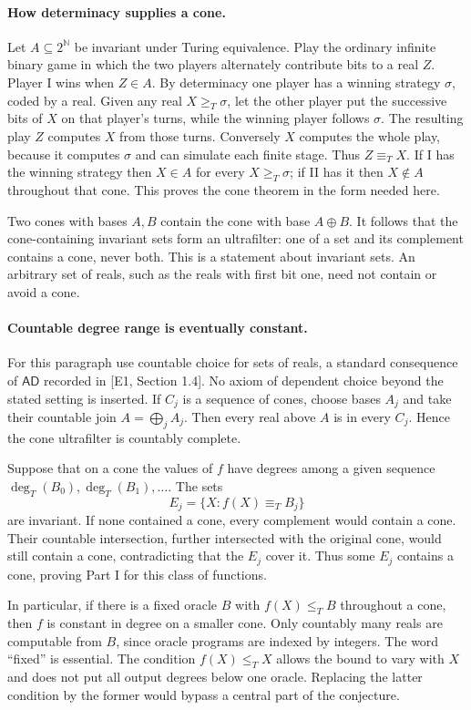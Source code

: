 \documentclass[11pt]{article}
\begin{document}
\paragraph{How determinacy supplies a cone.}
Let $A\subseteq2^{\mathbb N}$ be invariant under Turing equivalence.
Play the ordinary infinite binary game in which the two players
alternately contribute bits to a real $Z$. Player I wins when $Z\in A$.
By determinacy one player has a winning strategy $\sigma$, coded by
a real. Given any real $X\ge_T\sigma$, let the other player put the
successive bits of $X$ on that player's turns, while the winning player
follows $\sigma$. The resulting play $Z$ computes $X$ from those
turns. Conversely $X$ computes the whole play, because it computes
$\sigma$ and can simulate each finite stage. Thus $Z\equiv_T X$.
If I has the winning strategy then $X\in A$ for every $X\ge_T\sigma$;
if II has it then $X\notin A$ throughout that cone. This proves the
cone theorem in the form needed here.

Two cones with bases $A,B$ contain the cone with base $A\oplus B$.
It follows that the cone-containing invariant sets form an ultrafilter:
one of a set and its complement contains a cone, never both. This is
a statement about invariant sets. An arbitrary set of reals, such as
the reals with first bit one, need not contain or avoid a cone.

\paragraph{Countable degree range is eventually constant.}
For this paragraph use countable choice for sets of reals, a standard
consequence of $\mathsf{AD}$ recorded in [E1, Section 1.4]. No axiom
of dependent choice beyond the stated setting is inserted. If
$C_j$ is a sequence of cones, choose bases $A_j$ and take their
countable join $A=\bigoplus_j A_j$. Then every real above $A$ is in
every $C_j$. Hence the cone ultrafilter is countably complete.

Suppose that on a cone the values of $f$ have degrees among a given
sequence $\deg_T(B_0),\deg_T(B_1),\ldots$. The sets
\[
 E_j=\{X:f(X)\equiv_T B_j\}
\]
are invariant. If none contained a cone, every complement would
contain a cone. Their countable intersection, further intersected with
the original cone, would still contain a cone, contradicting that the
$E_j$ cover it. Thus some $E_j$ contains a cone, proving Part I for
this class of functions.

In particular, if there is a fixed oracle $B$ with $f(X)\le_T B$
throughout a cone, then $f$ is constant in degree on a smaller cone.
Only countably many reals are computable from $B$, since oracle
programs are indexed by integers. The word ``fixed'' is essential.
The condition $f(X)\le_T X$ allows the bound to vary with $X$ and
does not put all output degrees below one oracle. Replacing the latter
condition by the former would bypass a central part of the conjecture.
\end{document}
